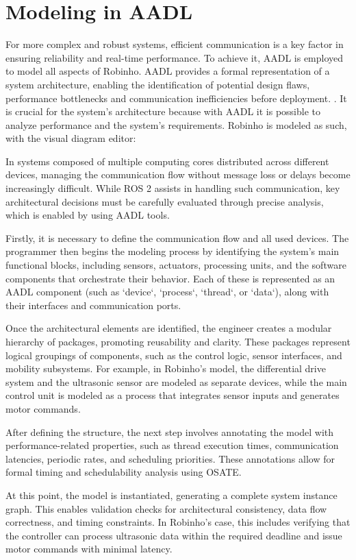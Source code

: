 \documentclass[
    12pt, 
    a4paper, 
    chapter=TITLE,		%
    section=TITLE,		%
    oneside,            %
    english
]{abntex2}
\begin{document}
\chapter{Modeling in AADL}
For more complex and robust systems, efficient communication is a key factor in ensuring reliability and real-time performance. To achieve it, AADL is employed to model all aspects of Robinho.
AADL provides a formal representation of a system architecture, enabling the identification of potential design flaws, performance bottlenecks and communication inefficiencies before deployment. \cite{Santos2024}. It is crucial for the system's architecture because with AADL it is possible to analyze performance and the system's requirements. Robinho is modeled as such, with the visual diagram editor:

In systems composed of multiple computing cores distributed across different devices, managing the communication flow without message loss or delays become increasingly difficult. While ROS 2 assists in handling such communication, key architectural decisions must be carefully evaluated through precise analysis, which is enabled by using AADL tools.

Firstly, it is necessary to define the communication flow and all used devices. The programmer then begins the modeling process by identifying the system’s main functional blocks, including sensors, actuators, processing units, and the software components that orchestrate their behavior. Each of these is represented as an AADL component (such as `device`, `process`, `thread`, or `data`), along with their interfaces and communication ports.

Once the architectural elements are identified, the engineer creates a modular hierarchy of packages, promoting reusability and clarity. These packages represent logical groupings of components, such as the control logic, sensor interfaces, and mobility subsystems. For example, in Robinho’s model, the differential drive system and the ultrasonic sensor are modeled as separate devices, while the main control unit is modeled as a process that integrates sensor inputs and generates motor commands.

After defining the structure, the next step involves annotating the model with performance-related properties, such as thread execution times, communication latencies, periodic rates, and scheduling priorities. These annotations allow for formal timing and schedulability analysis using OSATE.

At this point, the model is instantiated, generating a complete system instance graph. This enables validation checks for architectural consistency, data flow correctness, and timing constraints. In Robinho’s case, this includes verifying that the controller can process ultrasonic data within the required deadline and issue motor commands with minimal latency.
\end{document}
